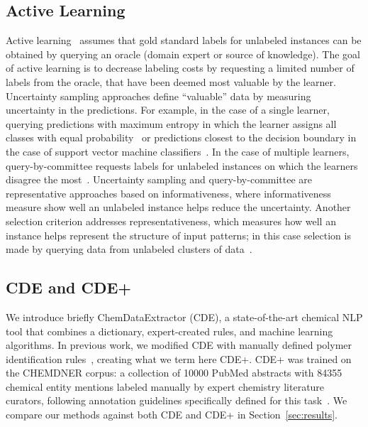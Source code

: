 \subsection{Active Learning}\label{sec:active}
Active learning~\cite{zhou2017brief} assumes that gold standard labels for unlabeled instances can be obtained by
querying an oracle (domain expert or source of knowledge).
The goal of active learning is to decrease labeling costs by requesting a limited number of labels from the oracle, that have been deemed most valuable by the learner.
Uncertainty sampling approaches define ``valuable'' data by measuring uncertainty in the predictions.
For example, in the case of a single learner, querying predictions with maximum entropy in which the learner assigns all classes with equal probability~\cite{lewis1994heterogeneous} or predictions closest to the decision boundary in the case of support vector machine classifiers~\cite{campbell2000query}.
In the case of multiple learners, query-by-committee requests labels for unlabeled instances on which the learners disagree the most~\cite{seung1992query}.
Uncertainty sampling and query-by-committee are representative approaches based on informativeness, where informativeness measure show well an unlabeled instance helps reduce the uncertainty. 
Another selection criterion addresses representativeness, which measures how well an instance helps represent the structure of input patterns; in this case selection is made by querying data from unlabeled clusters of data~\cite{nguyen2004active,dasgupta2008hierarchical}.

\subsection{CDE and CDE+}\label{sec:cde}
We introduce briefly ChemDataExtractor (CDE), 
a state-of-the-art chemical NLP tool that combines a dictionary, expert-created
rules, and machine learning algorithms.
In previous work, we modified CDE with
manually defined polymer identification rules~\cite{tchoua2017towards}, creating what we term here CDE+.
CDE+ was trained on the CHEMDNER corpus:
a collection of \num{10000} PubMed abstracts with \num{84355} chemical entity mentions labeled manually by expert chemistry literature curators, following annotation guidelines specifically defined for this task~\cite{krallinger2015chemdner}. 
We compare our methods against both CDE and CDE+ in Section~\ref{sec:results}.

